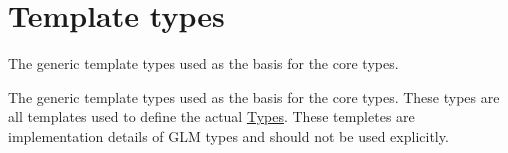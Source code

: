 \hypertarget{group__core__template}{\section{\-Template types}
\label{group__core__template}
}


\-The generic template types used as the basis for the core types.  


\-The generic template types used as the basis for the core types. \-These types are all templates used to define the actual \hyperlink{group__core__types}{\-Types}. \-These templetes are implementation details of \-G\-L\-M types and should not be used explicitly. 